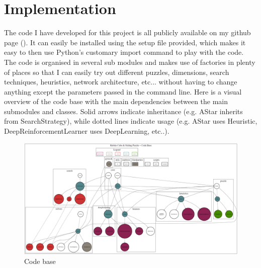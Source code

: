 
\chapter{Implementation} %

\label{sec:Implementation} %



The code I have developed for this project is all publicly available on my github page (\cite{FB}). It can easily be installed using the setup file provided, which makes it easy to then use Python's customary import command to play with the code.
The code is organised in several sub modules and makes use of factories in plenty of places so that I can easily try out different puzzles, dimensions, search techniques, heuristics, network architecture, etc... without having to change anything except the parameters passed in the command line. Here is a visual overview of the code base with the main dependencies between the main submodules and classes. Solid arrows indicate inheritance (e.g. AStar inherits from SearchStrategy), while dotted lines indicate usage (e.g. AStar uses Heuristic, DeepReinforcementLearner uses DeepLearning, etc..).

\begin{landscape}
\begin{figure}[H]
\centering
\includegraphics[scale=0.40]{./Figures/codebase}
\caption[Codebase]{Code base}
\label{fig:Codebase}
\end{figure}
\end{landscape}


